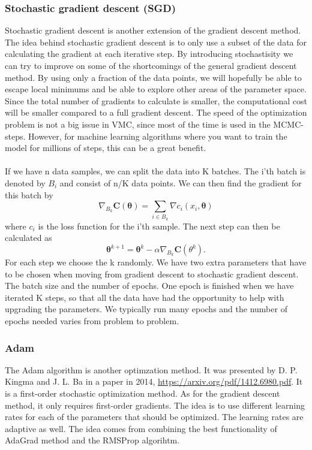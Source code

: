 \subsubsection{Stochastic gradient descent (SGD)}
Stochastic gradient descent is another extension of the gradient descent method. The idea behind stochastic gradient descent is to only use a subset of the data for calculating the gradient at each iterative step. By introducing stochastisity we can try to improve on some of the shortcomings of the general gradient descent method. By using only a fraction of the data points, we will hopefully be able to escape local minimums and be able to explore other areas of the parameter space. Since the total number of gradients to calculate is smaller, the computational cost will be smaller compared to a full gradient descent. The speed of the optimization problem is not a big issue in VMC, since most of the time is used in the MCMC-steps. However, for machine learning algorithms where you want to train the model for millions of steps, this can be a great benefit. 
\\
\\
If we have n data samples, we can split the data into K batches. The i'th batch is denoted by $B_i$ and consist of n/K data points. We can then find the gradient for this batch by
\begin{equation}
    \nabla_{B_k}\boldsymbol{C}(\boldsymbol{\theta}) = \sum_{i \in B_k}\nabla c_i(x_i, \boldsymbol{\theta})
\end{equation}
where $c_i$ is the loss function for the i'th sample. 
The next step can then be calculated as 
\begin{equation}
    \boldsymbol{\theta}^{k+1} = \boldsymbol{\theta}^k - \alpha \nabla_{B_k}\boldsymbol{ C}(\theta^k).
\end{equation}
For each step we choose the k randomly. We have two extra parameters that have to be chosen when moving from gradient descent to stochastic gradient descent. The batch size and the number of epochs. One epoch is finished when we have iterated K steps, so that all the data have had the opportunity to help with upgrading the parameters. We typically run many epochs and the number of epochs needed varies from problem to problem. 
\\
\subsubsection{Adam}
The Adam algorithm is another optimzation method. It was presented by D. P. Kingma and J. L. Ba in a paper in 2014, \url{https://arxiv.org/pdf/1412.6980.pdf}. It is a first-order stochastic optimization method. As for the gradient descent method, it only requires first-order gradients. The idea is to use different learning rates for each of the parameters that should be optimized. The learning rates are adaptive as well. The idea comes from combining the best functionality of AdaGrad method and the RMSProp algorihtm.
